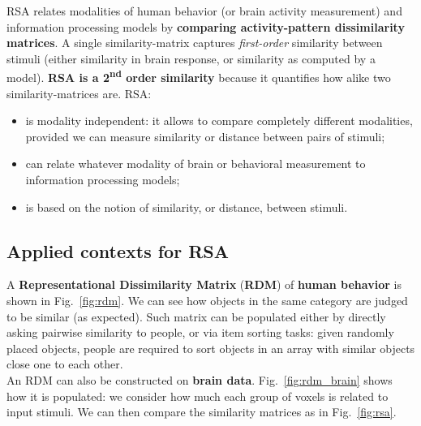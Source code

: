 RSA relates modalities of human behavior (or brain activity measurement) and information processing models by \textbf{comparing activity-pattern dissimilarity matrices}. A single similarity-matrix captures \textit{first-order} similarity between stimuli (either similarity in brain response, or similarity as computed by a  model). \textbf{RSA is a 2\textsuperscript{nd} order similarity} because it quantifies how alike two similarity-matrices are.
RSA:
\begin{itemize}
    \item is modality independent: it allows to compare completely different modalities, provided we can measure similarity or distance between pairs of stimuli;
    \item can relate whatever modality of brain or behavioral  measurement to information processing models;
    \item is based on the notion of similarity, or distance, between stimuli.
\end{itemize}

\subsection{Applied contexts for RSA}

A \textbf{Representational Dissimilarity Matrix} (\textbf{RDM}) of \textbf{human behavior} is shown in Fig.~\ref{fig:rdm}. We can see how objects in the same category are judged to be similar (as expected). Such matrix can be populated either by directly asking pairwise similarity to people, or via item sorting tasks: given randomly placed objects, people are required to sort objects in an array with similar objects close one to each other.\\

An RDM can also be constructed on \textbf{brain data}. Fig.~\ref{fig:rdm_brain} shows how it is populated: we consider how much each group of voxels is related to input stimuli. We can then compare the similarity matrices as in Fig.~\ref{fig:rsa}.

